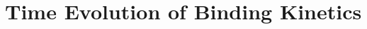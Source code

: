 \documentclass[../talant.diss.submit.tex]{subfiles}
\begin{document}
%                   
%
%

%
%
%

\section{\textbf{Time Evolution of Binding Kinetics}}
\end{document}
